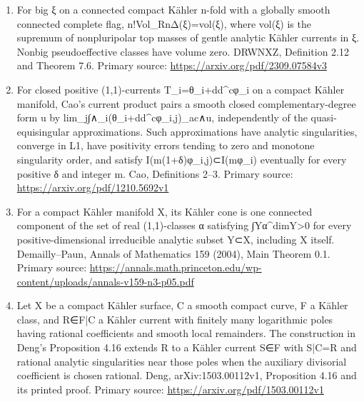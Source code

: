 \documentclass[11pt]{article}
\begin{document}
\begin{enumerate}
\item[7.] For big ξ on a connected compact Kähler n-\allowbreak{}fold with a globally smooth connected complete flag, n!Vol\_\allowbreak{}RnΔ(ξ)=\allowbreak{}vol(ξ), where vol(ξ) is the supremum of nonpluripolar top masses of gentle analytic Kähler currents in ξ. Nonbig pseudoeffective classes have volume zero. DRWNXZ, Definition 2.12 and Theorem 7.6. Primary source: \url{https://arxiv.org/pdf/2309.07584v3}

\item[8.] For closed positive (1,1)-\allowbreak{}currents T\_\allowbreak{}i=\allowbreak{}θ\_\allowbreak{}i+dd\textasciicircum{}\allowbreak{}cφ\_\allowbreak{}i on a compact Kähler manifold, Cao’s current product pairs a smooth closed complementary-\allowbreak{}degree form u by lim\_\allowbreak{}j∫∧\_\allowbreak{}i(θ\_\allowbreak{}i+dd\textasciicircum{}\allowbreak{}cφ\_\allowbreak{}i,j)\_\allowbreak{}ac∧u, independently of the quasi-\allowbreak{}equisingular approximations. Such approximations have analytic singularities, converge in L1, have positivity errors tending to zero and monotone singularity order, and satisfy I(m(1+δ)φ\_\allowbreak{}i,j)⊂I(mφ\_\allowbreak{}i) eventually for every positive δ and integer m. Cao, Definitions 2–3. Primary source: \url{https://arxiv.org/pdf/1210.5692v1}

\item[9.] For a compact Kähler manifold X, its Kähler cone is one connected component of the set of real (1,1)-\allowbreak{}classes α satisfying ∫Yα\textasciicircum{}\allowbreak{}dimY>0 for every positive-\allowbreak{}dimensional irreducible analytic subset Y⊂X, including X itself. Demailly–Paun, Annals of Mathematics 159 (2004), Main Theorem 0.1. Primary source: \url{https://annals.math.princeton.edu/wp-content/uploads/annals-v159-n3-p05.pdf}

\item[10.] Let X be a compact Kähler surface, C a smooth compact curve, F a Kähler class, and R∈F|C a Kähler current with finitely many logarithmic poles having rational coefficients and smooth local remainders. The construction in Deng’s Proposition 4.16 extends R to a Kähler current S∈F with S|C=\allowbreak{}R and rational analytic singularities near those poles when the auxiliary divisorial coefficient is chosen rational. Deng, arXiv:1503.00112v1, Proposition 4.16 and its printed proof. Primary source: \url{https://arxiv.org/pdf/1503.00112v1}

\end{enumerate}
\end{document}
